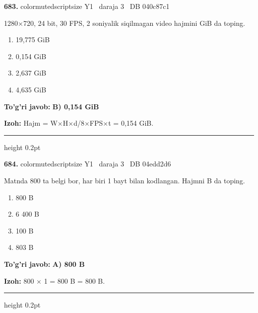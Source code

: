 \documentclass[10pt,a4paper,oneside]{article}
\begin{document}
\noindent\textbf{\color{ink}683.}  {color{muted}scriptsize Y1 \textbullet\ daraja 3 \textbullet\ DB 040c87c1}
\par
1280\ensuremath{\times}720, 24 bit, 30 FPS, 2 soniyalik siqilmagan video hajmini GiB da toping.
\begin{enumerate}[label=\Alph*),leftmargin=9mm]
\item 19,775 GiB
\item 0,154 GiB
\item 2,637 GiB
\item 4,635 GiB
\end{enumerate}
\begin{tcolorbox}[enhanced,breakable,colback=teal!4,colframe=teal!50!black,boxrule=0.5pt,arc=1.1mm,left=3mm,right=3mm,top=1.7mm,bottom=1.7mm,before skip=2mm,after skip=2mm]
\textbf{\color{teal}To'g'ri javob:} \textbf{B) 0,154 GiB}
\par\smallskip
\textbf{Izoh:} Hajm = W\ensuremath{\times}H\ensuremath{\times}d/8\ensuremath{\times}FPS\ensuremath{\times}t = 0,154 GiB.
\end{tcolorbox}
\vspace{2mm}\hrule height 0.2pt \vspace{3mm}

\noindent\textbf{\color{ink}684.}  {color{muted}scriptsize Y1 \textbullet\ daraja 3 \textbullet\ DB 04edd2d6}
\par
Matnda 800 ta belgi bor, har biri 1 bayt bilan kodlangan. Hajmni B da toping.
\begin{enumerate}[label=\Alph*),leftmargin=9mm]
\item 800 B
\item 6 400 B
\item 100 B
\item 803 B
\end{enumerate}
\begin{tcolorbox}[enhanced,breakable,colback=teal!4,colframe=teal!50!black,boxrule=0.5pt,arc=1.1mm,left=3mm,right=3mm,top=1.7mm,bottom=1.7mm,before skip=2mm,after skip=2mm]
\textbf{\color{teal}To'g'ri javob:} \textbf{A) 800 B}
\par\smallskip
\textbf{Izoh:} 800 \ensuremath{\times} 1 = 800 B = 800 B.
\end{tcolorbox}
\vspace{2mm}\hrule height 0.2pt \vspace{3mm}
\end{document}
